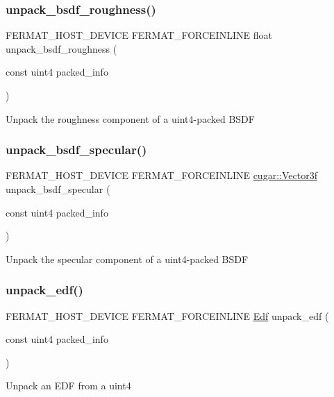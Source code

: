 \subsubsection{\texorpdfstring{unpack\+\_\+bsdf\+\_\+roughness()}{unpack\_bsdf\_roughness()}}
{\footnotesize\ttfamily F\+E\+R\+M\+A\+T\+\_\+\+H\+O\+S\+T\+\_\+\+D\+E\+V\+I\+CE F\+E\+R\+M\+A\+T\+\_\+\+F\+O\+R\+C\+E\+I\+N\+L\+I\+NE float unpack\+\_\+bsdf\+\_\+roughness (\begin{DoxyParamCaption}\item[{const uint4}]{packed\+\_\+info }\end{DoxyParamCaption})}

\begin{DoxyParagraph}{}
Unpack the roughness component of a uint4-\/packed B\+S\+DF 
\end{DoxyParagraph}
\mbox{\label{group___b_p_t_lib_core_gae8ae96255cfc4529971fc00aa44ac9ab}} 
\subsubsection{\texorpdfstring{unpack\+\_\+bsdf\+\_\+specular()}{unpack\_bsdf\_specular()}}
{\footnotesize\ttfamily F\+E\+R\+M\+A\+T\+\_\+\+H\+O\+S\+T\+\_\+\+D\+E\+V\+I\+CE F\+E\+R\+M\+A\+T\+\_\+\+F\+O\+R\+C\+E\+I\+N\+L\+I\+NE \hyperlink{structcugar_1_1_vector}{cugar\+::\+Vector3f} unpack\+\_\+bsdf\+\_\+specular (\begin{DoxyParamCaption}\item[{const uint4}]{packed\+\_\+info }\end{DoxyParamCaption})}

\begin{DoxyParagraph}{}
Unpack the specular component of a uint4-\/packed B\+S\+DF 
\end{DoxyParagraph}
\mbox{\label{group___b_p_t_lib_core_ga1d22946cfb852e33bf79b6e145eb10f9}} 
\subsubsection{\texorpdfstring{unpack\+\_\+edf()}{unpack\_edf()}}
{\footnotesize\ttfamily F\+E\+R\+M\+A\+T\+\_\+\+H\+O\+S\+T\+\_\+\+D\+E\+V\+I\+CE F\+E\+R\+M\+A\+T\+\_\+\+F\+O\+R\+C\+E\+I\+N\+L\+I\+NE \hyperlink{struct_edf}{Edf} unpack\+\_\+edf (\begin{DoxyParamCaption}\item[{const uint4}]{packed\+\_\+info }\end{DoxyParamCaption})}

\begin{DoxyParagraph}{}
Unpack an E\+DF from a uint4 
\end{DoxyParagraph}
